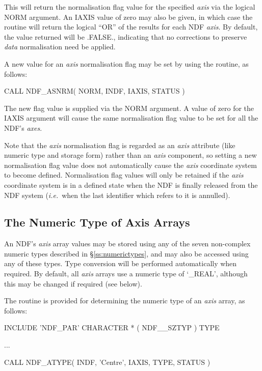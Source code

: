 \documentclass[twoside,11pt,nolof]{starlink}
\providecommand{\st}[1]{{\emph{#1}}}
\begin{document}
This will return the normalisation flag value for the specified \st{axis\/}
via the logical NORM argument.
An IAXIS value of zero may also be given, in which case the routine will
return the logical ``OR'' of the results for each NDF \st{axis}.
By default, the value returned will be .FALSE., indicating that no
corrections to preserve \st{data\/} normalisation need be applied.

A new value for an \st{axis\/} normalisation flag may be set by using the
 routine, as follows:

\small
\begin{terminalv}
      CALL NDF_ASNRM( NORM, INDF, IAXIS, STATUS )
\end{terminalv}
\normalsize

The new flag value is supplied via the NORM argument.
A value of zero for the IAXIS argument will cause the same normalisation
flag value to be set for all the NDF's \st{axes}.

Note that the \st{axis\/} normalisation flag is regarded as an \st{axis\/}
attribute (like numeric type and storage form) rather than an \st{axis\/}
component, so setting a new normalisation flag value does not automatically
cause the \st{axis\/} coordinate system to become defined.
Normalisation flag values will only be retained if the \st{axis\/}
coordinate system is in a defined state when the NDF is finally released
from the NDF system (\st{i.e.}\ when the last identifier which refers to it
is annulled).

\subsection{The Numeric Type of Axis Arrays}

An NDF's \st{axis\/} array values may be stored using any of the seven
non-complex numeric types described in \S\ref{ss:numerictypes}, and may also
be accessed using any of these types.
Type conversion will be performed automatically when required.
By default, all \st{axis\/} arrays use a numeric type of `\_REAL', although
this may be changed if required (see below).

The routine  is provided for determining the numeric type of an
\st{axis\/} array, as follows:

\small
\begin{terminalv}
      INCLUDE 'NDF_PAR'
      CHARACTER * ( NDF__SZTYP ) TYPE

      ...

      CALL NDF_ATYPE( INDF, 'Centre', IAXIS, TYPE, STATUS )
\end{terminalv}
\normalsize
\end{document}

